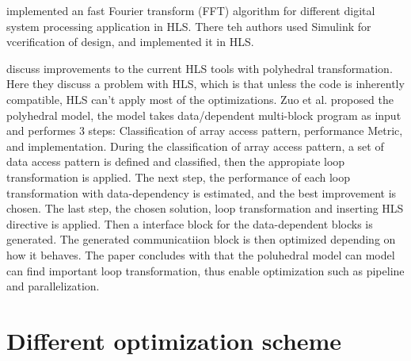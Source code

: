 \cite{Butt:2016:DPH:2888407.2871737} implemented an fast Fourier transform (FFT) algorithm for different digital system processing application in HLS. There teh authors used Simulink for vcerification of design, and implemented it in HLS.

\cite{Zuo:2013:IHL:2435264.2435271} discuss improvements to the current HLS tools with  polyhedral transformation. Here they discuss a problem with HLS, which is that unless the code is inherently compatible, HLS can't apply most of the optimizations. Zuo et al. proposed the polyhedral model, the model takes data/dependent multi-block program as input and performes 3 steps: Classification of array access pattern, performance Metric, and implementation. During the classification of array access pattern, a set of data access pattern is defined and classified, then the appropiate loop transformation is applied. The next step, the performance of each loop transformation with data-dependency is estimated, and the best improvement is chosen. The last step, the chosen solution, loop transformation and inserting HLS directive is applied. Then a interface block for the data-dependent blocks is generated. The generated communicatiion block is then optimized depending on how it behaves. The paper concludes with that the poluhedral model can model can find important loop transformation, thus enable optimization such as pipeline and parallelization.

\section{Different optimization scheme}

 